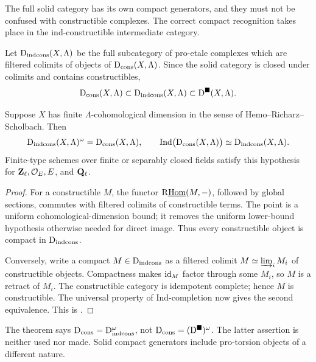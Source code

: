 The full solid category has its own compact generators, and they must not be
confused with constructible complexes.  The correct compact recognition
takes place in the ind-constructible intermediate category.

\begin{definition}
\label{def:indconstructible}
Let \(\mathrm D_{\mathrm{indcons}}(X,\Lambda)\) be the full subcategory of pro-etale complexes
which are filtered colimits of objects of \(\mathrm D_{\mathrm{cons}}(X,\Lambda)\).  Since the
solid category is closed under colimits and contains constructibles,
\[
 \mathrm D_{\mathrm{cons}}(X,\Lambda)
  \subset\mathrm D_{\mathrm{indcons}}(X,\Lambda)
  \subset\mathrm D^{\blacksquare}(X,\Lambda).
\]
\end{definition}

\begin{theorem}
\label{thm:indconstructible-compact-recognition}
Suppose \(X\) has finite \(\Lambda\)-cohomological dimension in the sense of
Hemo--Richarz--Scholbach.  Then
\[
 \mathrm D_{\mathrm{indcons}}(X,\Lambda)^\omega=\mathrm D_{\mathrm{cons}}(X,\Lambda),
 \qquad
 \operatorname{Ind}\bigl(\mathrm D_{\mathrm{cons}}(X,\Lambda)\bigr)
   \simeq\mathrm D_{\mathrm{indcons}}(X,\Lambda).
\]
Finite-type schemes over finite or separably closed fields satisfy this
hypothesis for \(\mathbf Z_\ell,\mathcal O_E,E\), and \(\mathbf Q_\ell\).
\end{theorem}

\begin{proof}
For a constructible \(M\), the functor
\(\mathrm R\underline{\operatorname{Hom}}(M,-)\), followed by global sections,
commutes with filtered colimits of constructible terms.  The point is a
uniform cohomological-dimension bound; it removes the uniform lower-bound
hypothesis otherwise needed for direct image.  Thus every constructible
object is compact in \(\mathrm D_{\mathrm{indcons}}\).

Conversely, write a compact \(M\in\mathrm D_{\mathrm{indcons}}\) as a filtered colimit
\(M\simeq\varinjlim_iM_i\) of constructible objects.  Compactness makes
\(\operatorname{id}_M\) factor through some \(M_i\), so \(M\) is a retract of \(M_i\).
The constructible category is idempotent complete; hence \(M\) is
constructible.  The universal property of Ind-completion now gives the
second equivalence.  This is
\cite[Proposition~8.2 and Corollary~8.3]{HRSConstructible}.
\end{proof}

\begin{warning}
The theorem says
\(\mathrm D_{\mathrm{cons}}=\mathrm D_{\mathrm{indcons}}^\omega\), not
\(\mathrm D_{\mathrm{cons}}=(\mathrm D^{\blacksquare})^\omega\).  The latter assertion is neither used nor made.
Solid compact generators include pro-torsion objects of a different nature.
\end{warning}

